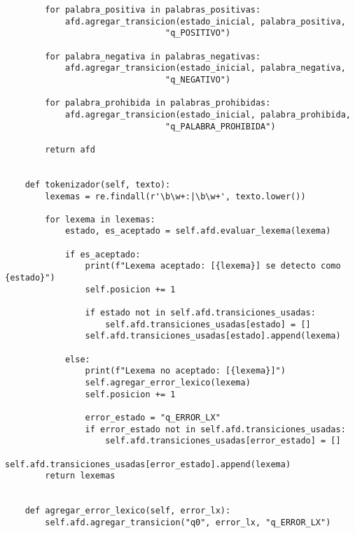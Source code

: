 \documentclass[12pt,a4paper]{article}
\begin{document}
\begin{verbatim}
        for palabra_positiva in palabras_positivas:
            afd.agregar_transicion(estado_inicial, palabra_positiva, 
                                "q_POSITIVO")

        for palabra_negativa in palabras_negativas:
            afd.agregar_transicion(estado_inicial, palabra_negativa, 
                                "q_NEGATIVO")
            
        for palabra_prohibida in palabras_prohibidas:
            afd.agregar_transicion(estado_inicial, palabra_prohibida, 
                                "q_PALABRA_PROHIBIDA")
        
        return afd


    def tokenizador(self, texto):
        lexemas = re.findall(r'\b\w+:|\b\w+', texto.lower())  
        
        for lexema in lexemas:
            estado, es_aceptado = self.afd.evaluar_lexema(lexema)
            
            if es_aceptado:
                print(f"Lexema aceptado: [{lexema}] se detecto como {estado}")
                self.posicion += 1
                
                if estado not in self.afd.transiciones_usadas:
                    self.afd.transiciones_usadas[estado] = []
                self.afd.transiciones_usadas[estado].append(lexema)

            else:
                print(f"Lexema no aceptado: [{lexema}]")
                self.agregar_error_lexico(lexema)
                self.posicion += 1
                
                error_estado = "q_ERROR_LX"
                if error_estado not in self.afd.transiciones_usadas:
                    self.afd.transiciones_usadas[error_estado] = []
                self.afd.transiciones_usadas[error_estado].append(lexema)
        return lexemas


    def agregar_error_lexico(self, error_lx):
        self.afd.agregar_transicion("q0", error_lx, "q_ERROR_LX")

\end{verbatim}
\end{document}
